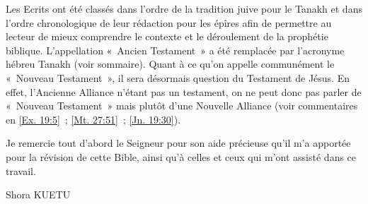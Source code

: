 \begin{small}
Les Ecrits ont été classés dans l'ordre de la tradition juive pour le Tanakh et dans l'ordre chronologique de leur rédaction pour les épîres afin de permettre au lecteur de mieux comprendre le contexte et le déroulement de la prophétie biblique. L'appellation «~Ancien Testament~» a été remplacée par l'acronyme hébreu Tanakh (voir sommaire). Quant à ce qu'on appelle communément le «~Nouveau Testament~», il sera désormais question du Testament de Jésus. En effet, l'Ancienne Alliance n'étant pas un testament, on ne peut donc pas parler de «~Nouveau Testament~» mais plutôt d'une Nouvelle Alliance (voir commentaires en \vref{Ex. 19:5}~; \vref{Mt. 27:51}~; \vref{Jn. 19:30}).

Je remercie tout d'abord le Seigneur pour son aide précieuse qu'il m'a apportée pour la révision de cette Bible, ainsi qu'à celles et ceux qui m’ont assisté dans ce travail.\newline

\begin{flushright}
Shora KUETU
\end{flushright}
\end{small}
